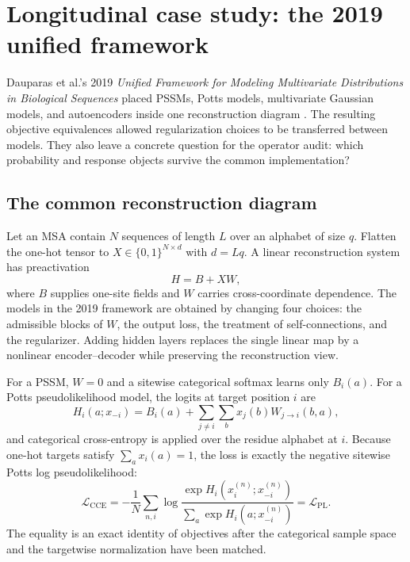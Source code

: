 \section{Longitudinal case study: the 2019 unified framework}

Dauparas et al.'s 2019 \emph{Unified Framework for Modeling Multivariate Distributions in
Biological Sequences} placed PSSMs, Potts models, multivariate Gaussian models, and autoencoders
inside one reconstruction diagram \cite{dauparas2019}.  The resulting objective equivalences
allowed regularization choices to be transferred between models.  They also leave a concrete
question for the operator audit: which probability and response objects survive the common
implementation?

\subsection{The common reconstruction diagram}

Let an MSA contain $N$ sequences of length $L$ over an alphabet of size $q$.  Flatten the one-hot
tensor to $X\in\{0,1\}^{N\times d}$ with $d=Lq$.  A linear reconstruction system has preactivation
\begin{equation}
H=B+XW,
\label{eq:book-unified-linear-map}
\end{equation}
where $B$ supplies one-site fields and $W$ carries cross-coordinate dependence.  The models in the
2019 framework are obtained by changing four choices: the admissible blocks of $W$, the output
loss, the treatment of self-connections, and the regularizer.  Adding hidden layers replaces the
single linear map by a nonlinear encoder--decoder while preserving the reconstruction view.

For a PSSM, $W=0$ and a sitewise categorical softmax learns only $B_i(a)$.  For a Potts
pseudolikelihood model, the logits at target position $i$ are
\begin{equation}
H_i(a;x_{-i})
=B_i(a)+\sum_{j\ne i}\sum_b x_j(b)W_{j\to i}(b,a),
\label{eq:book-unified-potts-logit}
\end{equation}
and categorical cross-entropy is applied over the residue alphabet at $i$.  Because one-hot targets
satisfy $\sum_a x_i(a)=1$, the loss is exactly the negative sitewise Potts log
pseudolikelihood:
\begin{equation}
\mathcal L_{\mathrm{CCE}}
=-\frac1N\sum_{n,i}
\log
\frac{\exp H_i(x_i^{(n)};x_{-i}^{(n)})}
{\sum_a\exp H_i(a;x_{-i}^{(n)})}
=\mathcal L_{\mathrm{PL}}.
\label{eq:book-unified-cce-pl}
\end{equation}
The equality is an exact identity of objectives after the categorical sample space and the
targetwise normalization have been matched.

